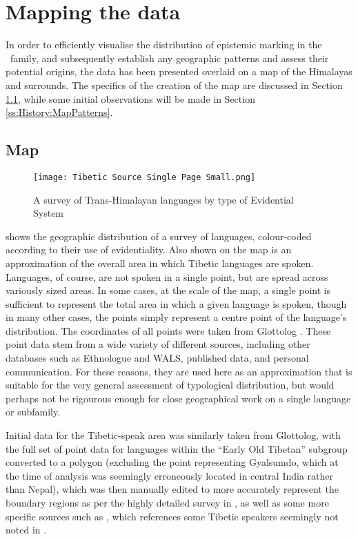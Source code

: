 \section{Mapping the data}\label{s:History:Map}
In order to efficiently visualise the distribution of epistemic marking in the \lfam\ family, and subsequently establish any geographic patterns and assess their potential origins, the data has been presented overlaid on a map of the Himalayas and surrounds. The specifics of the creation of the map are discussed in Section \ref{ss:History:Map}, while some initial observations will be made in Section \ref{ss:History:MapPatterns}.

\subsection{Map}\label{ss:History:Map}
\begin{figure}
    \caption{A survey of Trans-Himalayan languages by type of Evidential System}
    \centering
    \texttt{[image: Tibetic Source Single Page Small.png]}
    \label{map:EvidentialityMap}
\end{figure}
 shows the geographic distribution of a survey of languages, colour-coded according to their use of evidentiality. Also shown on the map is an approximation of the overall area in which Tibetic languages are spoken. Languages, of course, are not spoken in a single point, but are spread across variously sized areas. In some cases, at the scale of the map, a single point is sufficient to represent the total area in which a given language is spoken, though in many other cases, the points simply represent a centre point of the language's distribution. The coordinates of all points were taken from Glottolog \cite{glottolog}. These point data stem from a wide variety of different sources, including other databases such as Ethnologue and WALS, published data, and personal communication. For these reasons, they are used here as an approximation that is suitable for the very general assessment of typological distribution, but would perhaps not be rigourous enough for close geographical work on a single language or subfamily. 

Initial data for the Tibetic-speak area was similarly taken from Glottolog, with the full set of point data for languages within the ``Early Old Tibetan'' subgroup converted to a polygon (excluding the point representing Gyalsumdo, which at the time of analysis was seemingly erroneously located in central India rather than Nepal), which was then manually edited to more accurately represent the boundary regions as per the highly detailed survey in , as well as some more specific sources such as , which references some Tibetic speakers seemingly not noted in .

